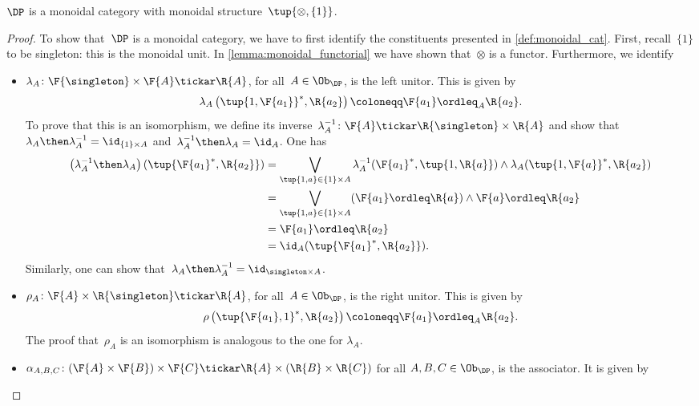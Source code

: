 \begin{lemma}
$\DP$ is a monoidal category with monoidal structure~$\tup{\otimes, \{1\}}$.
\end{lemma}
\begin{proof}
To show that~$\DP$ is a monoidal category, we have to first identify the constituents presented in \cref{def:monoidal_cat}. First, recall~$\{1\}$ to be singleton: this is the monoidal unit. In \cref{lemma:monoidal_functorial} we have shown that~$\otimes$ is a functor. Furthermore, we identify
\begin{itemize}
    \item $\lambda_A \colon \F{\singleton} \times \F{A} \tickar \R{A}$, for all~$A\in \Ob_\DP$, is the left unitor. This is given by
    \begin{equation}
        \lambda_A\left( \tup{1,\F{a_1}}^*,\R{a_2}\right)\coloneqq \F{a_1}\ordleq_A \R{a_2}.
    \end{equation}
    To prove that this is an isomorphism, we define its inverse~$\lambda_A^{-1}\colon \F{A}\tickar \R{\singleton} \times \R{A}$ and show that~$\lambda_A\then \lambda_A^{-1}=\id_{\{1\}\times A}$ and~$\lambda_A^{-1}\then \lambda_A=\id_{A}$. One has
    \begin{equation}
        \begin{aligned}
           \left( \lambda_A^{-1}\then \lambda_A\right)(\tup{\F{a_1}^*,\R{a_2}})&= \bigvee_{\tup{1,a}\in  \{1\}\times A} \lambda_A^{-1}(\F{a_1}^*,\tup{1,\R{a}})\wedge \lambda_A(\tup{1,\F{a}}^*,\R{a_2})\\
           &= \bigvee_{\tup{1,a}\in  \{1\}\times A}(\F{a_1}\ordleq \R{a}) \wedge \F{a}\ordleq \R{a_2}\\
           &=\F{a_1}\ordleq \R{a_2}\\
           &=\id_A(\tup{\F{a_1}^*,\R{a_2}}).
        \end{aligned}
    \end{equation}
    Similarly, one can show that~$\lambda_A\then \lambda_A^{-1}=\id_{\singleton \times A}$.
    \item $\rho_A\colon \F{A} \times \R{\singleton} \tickar \R{A}$, for all~$A\in \Ob_\DP$, is the right unitor. This is given by 
    \begin{equation}
        \rho\left( \tup{\F{a_1},1}^*,\R{a_2}\right)\coloneqq \F{a_1}\ordleq_A \R{a_2}.
    \end{equation}
    The proof that~$\rho_A$ is an isomorphism is analogous to the one for $\lambda_A$.
    \item $\alpha_{A,B,C}\colon (\F{A}\times \F{B})\times \F{C} \tickar \R{A} \times (\R{B}\times \R{C})$ for all $A,B,C \in \Ob_\DP$, is the associator. It is given by

\end{itemize}
\end{proof}
